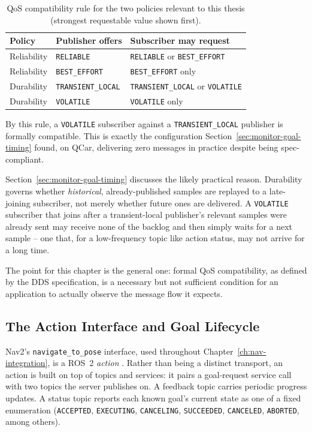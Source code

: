 \begin{table}[htbp]
  \centering
  \caption{QoS compatibility rule for the two policies relevant to this thesis (strongest requestable value shown first).}
  \label{tab:qos-compatibility}
  \begin{tabular}{@{}lll@{}}
    \toprule
    Policy & Publisher offers & Subscriber may request \\
    \midrule
    Reliability & \texttt{RELIABLE} & \texttt{RELIABLE} or \texttt{BEST\_EFFORT} \\
    Reliability & \texttt{BEST\_EFFORT} & \texttt{BEST\_EFFORT} only \\
    Durability & \texttt{TRANSIENT\_LOCAL} & \texttt{TRANSIENT\_LOCAL} or \texttt{VOLATILE} \\
    Durability & \texttt{VOLATILE} & \texttt{VOLATILE} only \\
    \bottomrule
  \end{tabular}
\end{table}

By this rule, a \texttt{VOLATILE} subscriber against a
\texttt{TRANSIENT\_LOCAL} publisher is formally compatible. This is
exactly the configuration Section~\ref{sec:monitor-goal-timing}
found, on QCar, delivering zero messages in practice
despite being spec-compliant.

Section~\ref{sec:monitor-goal-timing} discusses the likely practical
reason. Durability governs whether \emph{historical}, already-published
samples are replayed to a late-joining subscriber, not merely
whether future ones are delivered. A \texttt{VOLATILE} subscriber
that joins after a transient-local publisher's relevant samples were
already sent may receive none of the backlog and then simply waits
for a next sample -- one that, for a low-frequency topic like action
status, may not arrive for a long time.

The point for this chapter is the general one: formal QoS
compatibility, as defined by the DDS specification, is a necessary
but not sufficient condition for an application to actually observe
the message flow it expects.

\subsection{The Action Interface and Goal Lifecycle}
\label{sec:action-lifecycle}

Nav2's \texttt{navigate\_to\_pose} interface, used throughout
Chapter~\ref{ch:nav-integration}, is a ROS~2 \emph{action}
\cite{macenski2022ros2}. Rather than being a distinct transport, an
action is built on top of topics and services: it pairs a
goal-request service call with two topics the server publishes on. A
feedback topic carries periodic progress updates. A status topic
reports each known goal's current state as one of a fixed
enumeration (\texttt{ACCEPTED}, \texttt{EXECUTING},
\texttt{CANCELING}, \texttt{SUCCEEDED}, \texttt{CANCELED},
\texttt{ABORTED}, among others).

